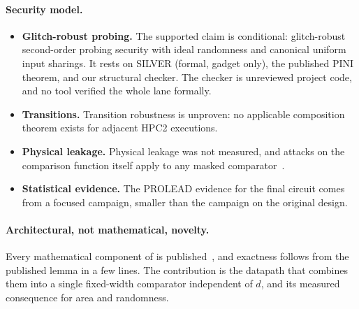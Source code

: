 \paragraph{Security model.}
\begin{itemize}
  \item \textbf{Glitch-robust probing.} The supported claim is conditional: glitch-robust second-order probing security with ideal randomness and canonical uniform input sharings. It rests on SILVER (formal, gadget only), the published PINI theorem, and our structural checker. The checker is unreviewed project code, and no tool verified the whole lane formally.
  \item \textbf{Transitions.} Transition robustness is unproven: no applicable composition theorem exists for adjacent HPC2 executions.
  \item \textbf{Physical leakage.} Physical leakage was not measured, and attacks on the comparison function itself apply to any masked comparator~\cite{hermelink2024}.
  \item \textbf{Statistical evidence.} The PROLEAD evidence for the final circuit comes from a focused campaign, smaller than the campaign on the original design.
\end{itemize}

\paragraph{Architectural, not mathematical, novelty.} Every mathematical component of \PAMS{} is published~\cite{coron2023dil,coron2023poly,bos2021masking,azouaoui2023}, and exactness follows from the published lemma in a few lines. The contribution is the datapath that combines them into a single fixed-width comparator independent of $d$, and its measured consequence for area and randomness.

